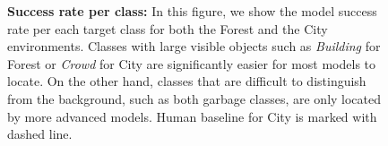 \begin{figure}[t]
\begin{scriptsize}
\vspace{0.5cm}

\end{scriptsize}
\caption{\textbf{Success rate per class:} In this figure, we show the model success rate per each target class for both the Forest and the City environments. Classes with large visible objects such as \textit{Building} for Forest or \textit{Crowd} for City are significantly easier for most models to locate. On the other hand, classes that are difficult to distinguish from the background, such as both garbage classes, are only located by more advanced models. Human baseline for City is marked with dashed line.}
\label{fig:accuracy-per-class}
\end{figure}